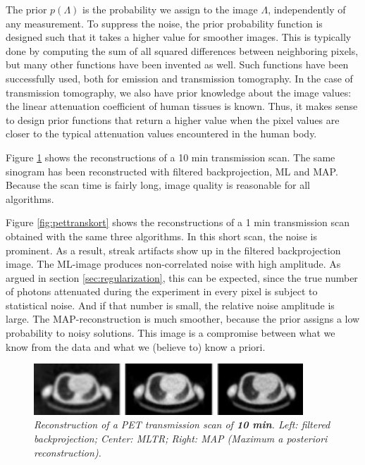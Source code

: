 The prior $p(\Lambda)$ is the probability we assign to the image $\Lambda$,
independently of any measurement. To suppress the noise, the prior probability
function is designed such that it takes a higher value for smoother images.
This is typically done by computing the sum of all squared differences between
neighboring pixels, but many other functions have been invented as well.
Such functions have been successfully used, both for emission and transmission
tomography. In the case of transmission tomography, we also have prior knowledge
about the image values: the linear attenuation coefficient of human tissues is
known. Thus, it makes sense to design prior functions that return a higher value
when the pixel values are closer to the typical attenuation values encountered
in the human body.

Figure \ref{fig:pettranslang} shows the reconstructions of a 10 min
transmission scan. The same sinogram has been reconstructed with filtered
backprojection, ML and MAP. Because the scan time is fairly long, image
quality is reasonable for all algorithms.

Figure \ref{fig:pettranskort} shows the reconstructions of a 1 min
transmission scan obtained with the same three algorithms. In this short scan,
the noise is prominent. As a result, streak artifacts show up in the filtered
backprojection image. The ML-image produces non-correlated noise with high
amplitude. As argued in section \ref{sec:regularization}, this can be expected,
since the true number of photons attenuated during the experiment in every
pixel is subject to statistical noise. And if that number is small, the
relative noise amplitude is large. The MAP-reconstruction is much smoother,
because the prior assigns a low probability to noisy solutions. This image is
a compromise between what we know from the data and what we (believe to) know
a priori.

\begin{figure}[tb]
\centering
\includegraphics[width=0.9\textwidth]{figs/fig_pettranslang.pdf}
\caption{\label{fig:pettranslang} \emph{Reconstruction of a PET transmission
scan of {\bf 10 min}. Left: filtered backprojection; Center: MLTR; Right: MAP
(Maximum a posteriori reconstruction).}}
\end{figure}

